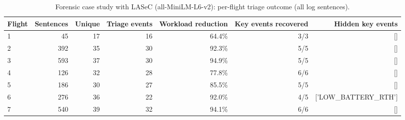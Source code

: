 \begin{table}[t]
\centering
\caption{Forensic case study with LASeC (all-MiniLM-L6-v2): per-flight triage outcome (all log sentences).}
\label{tab:case_study_lasec}
\small
\begin{tabular}{lrrrrrr}
\toprule
Flight & Sentences & Unique & Triage events & Workload reduction & Key events recovered & Hidden key events \\
\midrule
1 & 45 & 17 & 16 & 64.4\% & 3/3 & [] \\
2 & 392 & 35 & 30 & 92.3\% & 5/5 & [] \\
3 & 593 & 37 & 30 & 94.9\% & 5/5 & [] \\
4 & 126 & 32 & 28 & 77.8\% & 6/6 & [] \\
5 & 186 & 30 & 27 & 85.5\% & 5/5 & [] \\
6 & 276 & 36 & 22 & 92.0\% & 4/5 & ['LOW\_BATTERY\_RTH'] \\
7 & 540 & 39 & 32 & 94.1\% & 6/6 & [] \\
\bottomrule
\end{tabular}
\end{table}